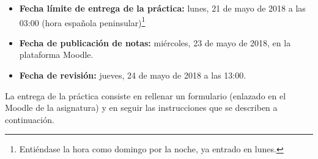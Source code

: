 \begin{itemize}
  \item \textbf{Fecha límite de entrega de la práctica:} lunes, 21 de mayo de 2018 a las 03:00 (hora española peninsular)\footnote{Entiéndase la hora como domingo por la noche, ya entrado en lunes.}

  \item \textbf{Fecha de publicación de notas:} miércoles, 23 de mayo de 2018, en la plataforma Moodle.

  \item \textbf{Fecha de revisión:} jueves, 24 de mayo de 2018 a las 13:00.
\end{itemize}

La entrega de la práctica consiste en rellenar un formulario (enlazado en el Moodle de la asignatura) y en seguir las instrucciones que se describen a continuación.

